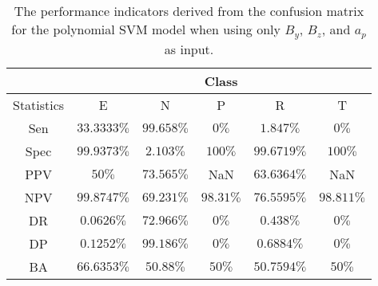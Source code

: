 \begin{table}[!ht]
	\centering
	\begin{tabular}{|c|c|c|c|c|c|}
		\hline
		 & \multicolumn{5}{c|}{Class} \\ \hline
		Statistics & E & N & P & R & T \\ \hline
		Sen & $33.3333\%$ & $99.658\%$ & $0\%$ & $1.847\%$ & $0\%$ \\ \hline
		Spec & $99.9373\%$ & $2.103\%$ & $100\%$ & $99.6719\%$ & $100\%$ \\ \hline
		PPV & $50\%$ & $73.565\%$ & NaN & $63.6364\%$ & NaN \\ \hline
		NPV & $99.8747\%$ & $69.231\%$ & $98.31\%$ & $76.5595\%$ & $98.811\%$ \\ \hline
		DR & $0.0626\%$ & $72.966\%$ & $0\%$ & $0.438\%$ & $0\%$ \\ \hline
		DP & $0.1252\%$ & $99.186\%$ & $0\%$ & $0.6884\%$ & $0\%$ \\ \hline
		BA & $66.6353\%$ & $50.88\%$ & $50\%$ & $50.7594\%$ & $50\%$ \\ \hline
	\end{tabular}
	\caption{The performance indicators derived from the confusion matrix for the polynomial SVM model when using only $B_{y}$, $B_{z}$, and $a_{p}$ as input.}
	\label{tab:cs:reverse:yzap:svmPoly}
\end{table}
